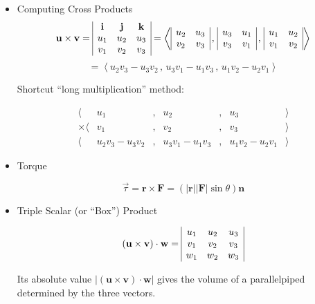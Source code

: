 \documentclass[12pt]{article}
\newcommand{\vect}[1]{\mathbf{#1}}
\newcommand{\veci}{\mathbf{i}}
\newcommand{\vecj}{\mathbf{j}}
\newcommand{\veck}{\mathbf{k}}
\newcommand{\<}{\left<}
\renewcommand{\>}{\right>}
\begin{document}
\begin{itemize}
\begin{itemize}
			\end{itemize}
		\item Computing Cross Products
\[
		\vect{u} \times \vect{v} = 
\begin{array}{|c c c|}
\veci & \vecj & \veck \\
u_1 & u_2 & u_3 \\
v_1 & v_2 & v_3 \\
\end{array}
		=
		\<
\begin{array}{|c c|}
u_2 & u_3 \\
v_2 & v_3 \\
\end{array}
		\,,\,
\begin{array}{|c c|}
u_3 & u_1 \\
v_3 & v_1 \\
\end{array}
		\,,\,
\begin{array}{|c c|}
u_1 & u_2 \\
v_1 & v_2 \\
\end{array}
		\>
\]
		\[
		=
		\<u_2v_3-u_3v_2\,,\,u_3v_1-u_1v_3\,,\,u_1v_2-u_2v_1\>
		\]
		
		Shortcut ``long multiplication'' method:
		
		\[
\begin{array}{rcccccl}
\langle& u_1 & , & u_2 & , & u_3 & \rangle \\
\times\langle & v_1 & , & v_2 & , & v_3 & \rangle \\\hline
\langle & u_2v_3-u_3v_2 & , & u_3v_1-u_1v_3 & , & u_1v_2-u_2v_1 & \rangle
\end{array}
		\]
		
		\item Torque
		
		\[\overrightarrow{\tau} = \vect{r} \times \vect{F} = (|\vect{r}||\vect{F}|\sin \theta)\vect{n} \]
		
		\item Triple Scalar (or ``Box'') Product
		
		\[
		(\vect{u}\times\vect{v})\cdot\vect{w} =
		\begin{array}{|c c c|}
		u_1 & u_2 & u_3 \\
		v_1 & v_2 & v_3 \\
		w_1 & w_2 & w_3 \\
		\end{array}
		\]
		
		Its absolute value $|(\vect{u}\times\vect{v})\cdot\vect{w}|$ gives the volume of a parallelpiped determined by the three vectors.
		

\end{itemize}
\end{document}
